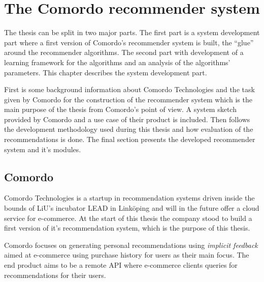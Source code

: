 
\chapter{The Comordo recommender system}\label{cha:recsys}

The thesis can be split in two major parts. The first part is a system development part where a first version of Comordo's recommender system is built, the ``glue'' around the recommender algorithms. The second part with development of a learning framework for the algorithms and an analysis of the algorithms' parameters. This chapter describes the system development part.

First is some background information about Comordo Technologies and the task given by Comordo for the construction of the recommender system which is the main purpose of the thesis from Comordo's point of view. A system sketch provided by Comordo and a use case of their product is included. Then follows the development methodology used during this thesis and how evaluation of the recommendations is done. The final section presents the developed recommender system and it's modules.


\section{Comordo}

Comordo Technologies is a startup in recommendation systems driven inside the bounds of LiU's incubator LEAD in Linköping and will in the future offer a cloud service for e-commerce. At the start of this thesis the company stood to build a first version of it's recommendation system, which is the purpose of this thesis.

Comordo focuses on generating personal recommendations using \textit{implicit feedback} aimed at e-commerce using purchase history for users as their main focus. The end product aims to be a remote API where e-commerce clients queries for recommendations for their users.







\newpage
